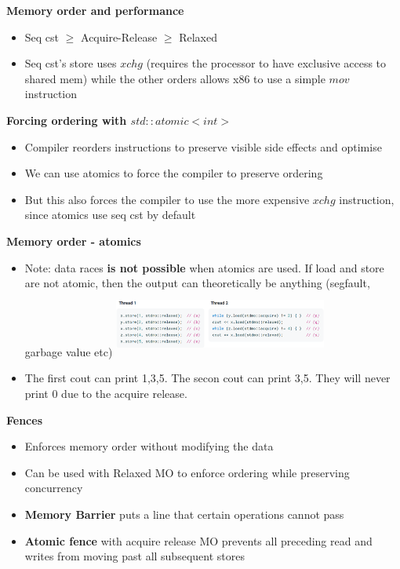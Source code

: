 \documentclass[10pt, landscape]{article}
\begin{document}
\begin{multicols}{4}
\textbf{Memory order and performance} \\ 
\begin{itemize}
    \item Seq cst $\ge$ Acquire-Release $\ge$ Relaxed
    \item Seq cst's store uses $xchg$ (requires the processor to have exclusive access to shared mem) while the other orders allows x86 to use a simple $mov$ instruction
\end{itemize}

\textbf{Forcing ordering with $std::atomic<int>$} \\
\begin{itemize}
    \item Compiler reorders instructions to preserve visible side effects and optimise 
    \item We can use atomics to force the compiler to preserve ordering
    \item But this also forces the compiler to use the more expensive $xchg$ instruction, since atomics use seq cst by default
\end{itemize}

\textbf{Memory order - atomics} \\
\begin{itemize}
    \item Note: data races \textbf{is not possible} when atomics are used. If load and store are not atomic, then the output can theoretically be anything (segfault, garbage value etc)
    \includegraphics*[width=7cm,height=2.2cm]{t2_1.png}
    \item The first cout can print 1,3,5. The secon cout can print 3,5. They will never print 0 due to the acquire release.
\end{itemize}

\textbf{Fences} \\
\begin{itemize}
    \item Enforces memory order without modifying the data 
    \item Can be used with Relaxed MO to enforce ordering while preserving concurrency 
    \item \textbf{Memory Barrier} puts a line that certain operations cannot pass 
    \item \textbf{Atomic fence} with acquire release MO prevents all preceding read and writes from moving past all subsequent stores
\end{itemize}


\end{multicols}
\end{document}
